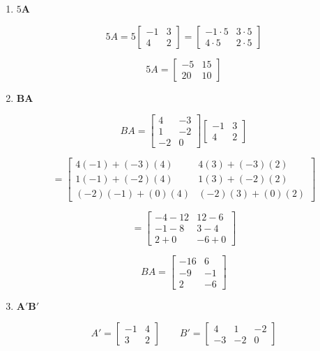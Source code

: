 \documentclass[12pt]{article}
\begin{document}
\begin{enumerate}
\item[(a)] $5\mathbf{A}$

$$
5A
=
5
\begin{bmatrix}
-1 & 3\\
4 & 2
\end{bmatrix}
=
\begin{bmatrix}
-1\cdot5 & 3\cdot5\\
4\cdot5 & 2\cdot5
\end{bmatrix}
$$

$$
\boxed{
5A=
\begin{bmatrix}
-5 & 15\\
20 & 10
\end{bmatrix}
}
$$

\item[(b)] $\mathbf{B}\mathbf{A}$

$$
BA
=
\begin{bmatrix}
4 & -3\\
1 & -2\\
-2 & 0
\end{bmatrix}
\begin{bmatrix}
-1 & 3\\
4 & 2
\end{bmatrix}
$$

$$
=
\begin{bmatrix}
4(-1)+(-3)(4) & 4(3)+(-3)(2)\\
1(-1)+(-2)(4) & 1(3)+(-2)(2)\\
(-2)(-1)+(0)(4) & (-2)(3)+(0)(2)
\end{bmatrix}
$$

$$
=
\begin{bmatrix}
-4-12 & 12-6\\
-1-8 & 3-4\\
2+0 & -6+0
\end{bmatrix}
$$

$$
\boxed{
BA=
\begin{bmatrix}
-16 & 6\\
-9 & -1\\
2 & -6
\end{bmatrix}
}
$$

\item[(c)] $\mathbf{A}'\mathbf{B}'$

$$
A'
=
\begin{bmatrix}
-1 & 4\\
3 & 2
\end{bmatrix}
\qquad
B'
=
\begin{bmatrix}
4 & 1 & -2\\
-3 & -2 & 0
\end{bmatrix}
$$


\end{enumerate}
\end{document}

